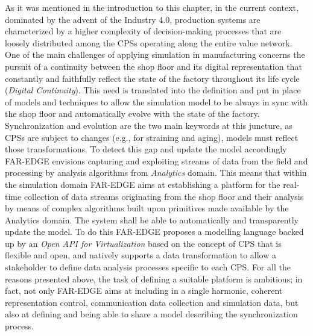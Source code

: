 As it was mentioned in the introduction to this chapter, in the current context, dominated by the advent of the Industry 4.0, production systems are characterized by a higher complexity of decision-making processes that are loosely distributed among the CPSs operating along the entire value network. 
One of the main challenges of applying simulation in manufacturing concerns the pursuit of a continuity between the shop floor and its digital representation that constantly and faithfully reflect the state of the factory throughout its life cycle (\textit{Digital Continuity}).
This need is translated into the definition and put in place of models and techniques to allow the simulation model to be always in sync with the shop floor and automatically evolve with the state of the factory. 
Synchronization and evolution are the two main keywords at this juncture, as CPSs are subject to changes (e.g., for straining and aging), models must reflect those transformations. 
To detect this gap and update the model accordingly FAR-EDGE envisions capturing and exploiting streams of data from the field and processing by analysis algorithms from \textit{Analytics} domain. 
This means that within the simulation domain FAR-EDGE aims at establishing a platform for the real-time collection of data streams originating from the shop floor and their analysis by means of complex algorithms built upon primitives made available by the Analytics domain. 
The system shall be able to automatically and transparently update the model. 
To do this FAR-EDGE proposes a modelling language backed up by an \textit{Open API for Virtualization} based on the concept of CPS that is flexible and open, and natively supports a data transformation to allow a stakeholder to define data analysis processes specific to each CPS.
For all the reasons presented above, the task of defining a suitable platform is ambitious; in fact, not only FAR-EDGE aims at including in a single harmonic, coherent representation control, communication data collection and simulation data, but also at defining and being able to share a model describing the synchronization process. 




